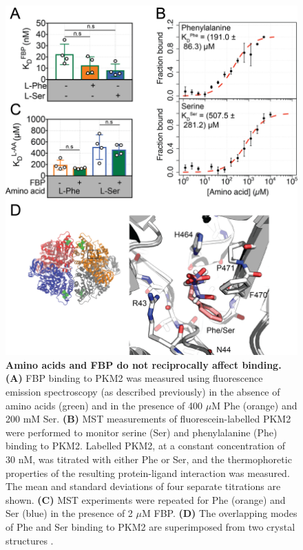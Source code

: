 %
%
%
\begin{figure}[!ht]
\includegraphics[scale=0.7]{ch4_fig7_FBP_AA_binding.png}
\caption[Amino acids and FBP do not reciprocally affect binding.] {\textbf{Amino acids and FBP do not reciprocally affect binding.} \textbf{(A)} FBP binding to PKM2 was measured using fluorescence emission spectroscopy (as described previously) in the absence of amino acids (green) and in the presence of 400 $\mu$M Phe (orange) and 200 mM Ser. \textbf{(B)} MST measurements of fluorescein-labelled PKM2 were performed to monitor serine (Ser) and phenylalanine (Phe) binding to PKM2. Labelled PKM2, at a constant concentration of 30 nM, was titrated with either Phe or Ser, and the thermophoretic properties of the resulting protein-ligand interaction was measured. The mean and standard deviations of four separate titrations are shown. \textbf{(C)} MST experiments were repeated for Phe (orange) and Ser (blue) in the presence of 2 $\mu$M FBP. \textbf{(D)} The overlapping modes of Phe and Ser binding to PKM2 are superimposed from two crystal structures \cite{Chaneton:2012aa,Morgan:2013aa}.}
\label{fig:AA_binding}
\end{figure}
\clearpage




